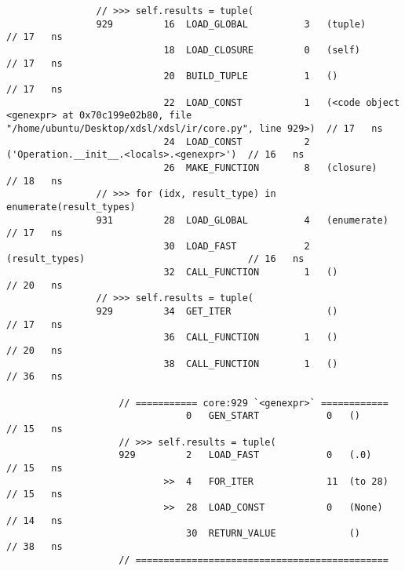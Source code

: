 \begin{code}
\begin{verbatim}
                // >>> self.results = tuple(
                929         16  LOAD_GLOBAL          3   (tuple)                                    // 17   ns
                            18  LOAD_CLOSURE         0   (self)                                     // 17   ns
                            20  BUILD_TUPLE          1   ()                                         // 17   ns
                            22  LOAD_CONST           1   (<code object <genexpr> at 0x70c199e02b80, file "/home/ubuntu/Desktop/xdsl/xdsl/ir/core.py", line 929>)  // 17   ns
                            24  LOAD_CONST           2   ('Operation.__init__.<locals>.<genexpr>')  // 16   ns
                            26  MAKE_FUNCTION        8   (closure)                                  // 18   ns
                // >>> for (idx, result_type) in enumerate(result_types)
                931         28  LOAD_GLOBAL          4   (enumerate)                                // 17   ns
                            30  LOAD_FAST            2   (result_types)                             // 16   ns
                            32  CALL_FUNCTION        1   ()                                         // 20   ns
                // >>> self.results = tuple(
                929         34  GET_ITER                 ()                                         // 17   ns
                            36  CALL_FUNCTION        1   ()                                         // 20   ns
                            38  CALL_FUNCTION        1   ()                                         // 36   ns

                    // =========== core:929 `<genexpr>` ============
                                0   GEN_START            0   ()                                     // 15   ns
                    // >>> self.results = tuple(
                    929         2   LOAD_FAST            0   (.0)                                   // 15   ns
                            >>  4   FOR_ITER             11  (to 28)                                // 15   ns
                            >>  28  LOAD_CONST           0   (None)                                 // 14   ns
                                30  RETURN_VALUE             ()                                     // 38   ns
                    // =============================================


\end{verbatim}
\end{code}
